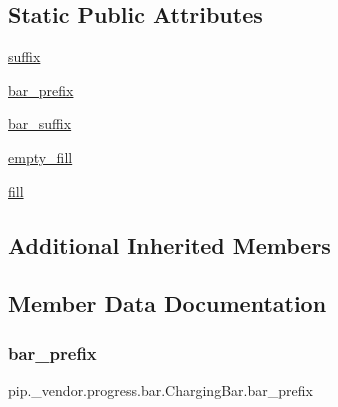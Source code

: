 \subsection*{Static Public Attributes}
\begin{DoxyCompactItemize}
\item 
\hyperlink{classpip_1_1__vendor_1_1progress_1_1bar_1_1ChargingBar_ae08a9751e5e27b40306c5a23967cf0ab}{suffix}
\item 
\hyperlink{classpip_1_1__vendor_1_1progress_1_1bar_1_1ChargingBar_af1073d7edc04ef31b55c05ba86014b55}{bar\+\_\+prefix}
\item 
\hyperlink{classpip_1_1__vendor_1_1progress_1_1bar_1_1ChargingBar_ae3b142f76be04926ce20cf96c2eff6fa}{bar\+\_\+suffix}
\item 
\hyperlink{classpip_1_1__vendor_1_1progress_1_1bar_1_1ChargingBar_aaa9e230bb0c4ed9edd257758acb86d26}{empty\+\_\+fill}
\item 
\hyperlink{classpip_1_1__vendor_1_1progress_1_1bar_1_1ChargingBar_aca4756fddffef9eed58f8b2a7588d8d8}{fill}
\end{DoxyCompactItemize}
\subsection*{Additional Inherited Members}


\subsection{Member Data Documentation}
\mbox{\label{classpip_1_1__vendor_1_1progress_1_1bar_1_1ChargingBar_af1073d7edc04ef31b55c05ba86014b55}} 
\subsubsection{\texorpdfstring{bar\+\_\+prefix}{bar\_prefix}}
{\footnotesize\ttfamily pip.\+\_\+vendor.\+progress.\+bar.\+Charging\+Bar.\+bar\+\_\+prefix\hspace{0.3cm}{\ttfamily [static]}}

\mbox{\label{classpip_1_1__vendor_1_1progress_1_1bar_1_1ChargingBar_ae3b142f76be04926ce20cf96c2eff6fa}} 
